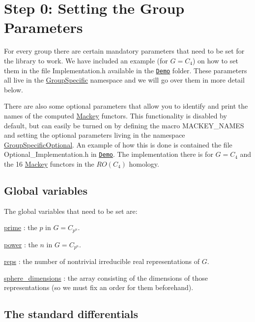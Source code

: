 \hypertarget{use_how}{}\section{Step 0\+: Setting the Group Parameters}\label{use_how}

\begin{DoxyItemize}
\item For every group there are certain mandatory parameters that need to be set for the library to work. We have included an example (for $G=C_4$) on how to set them in the file Implementation.\+h available in the \href{https://github.com/NickG-Math/Mackey/tree/master/Demo}{\tt Demo} folder. These parameters all live in the \hyperlink{namespaceGroupSpecific}{Group\+Specific} namespace and we will go over them in more detail below.
\item There are also some optional parameters that allow you to identify and print the names of the computed \hyperlink{namespaceMackey}{Mackey} functors. This functionality is disabled by default, but can easily be turned on by defining the macro M\+A\+C\+K\+E\+Y\+\_\+\+N\+A\+M\+ES and setting the optional parameters living in the namespace \hyperlink{namespaceGroupSpecificOptional}{Group\+Specific\+Optional}. An example of how this is done is contained the file Optional\+\_\+\+Implementation.\+h in \href{https://github.com/NickG-Math/Mackey/tree/master/Demo}{\tt Demo}. The implementation there is for $G=C_4$ and the 16 \hyperlink{namespaceMackey}{Mackey} functors in the $RO(C_4)$ homology.
\end{DoxyItemize}\hypertarget{use_var}{}\subsection{Global variables}\label{use_var}
The global variables that need to be set are\+:


\begin{DoxyItemize}
\item \hyperlink{classGroupSpecific_1_1Variables_a38586ec998bcbfdf325e6cfc6598b54b}{prime} \+: the $p$ in $G=C_{p^n}$.
\item \hyperlink{classGroupSpecific_1_1Variables_ac9bd6be19cc41e6877ee25a2d1c7be80}{power} \+: the $n$ in $G=C_{p^n}$.
\item \hyperlink{classGroupSpecific_1_1Variables_a5504789b0b60050e6ea223fdeb84874a}{reps} \+: the number of nontrivial irreducible real representations of $G$.
\item \hyperlink{classGroupSpecific_1_1Variables_a4746f16736abcf4c705dd8690ec12ca0}{sphere\+\_\+dimensions} \+: the array consisting of the dimensions of those representations (so we must fix an order for them beforehand).
\end{DoxyItemize}\hypertarget{use_fun}{}\subsection{The standard differentials}\label{use_fun}

